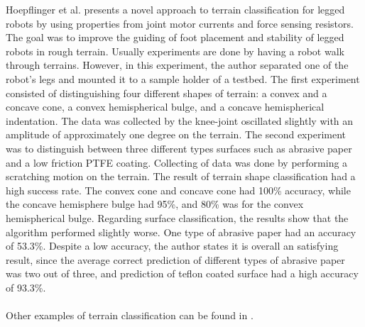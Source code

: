 \documentclass[USenglish]{ifimaster}  %
\begin{document}
Hoepflinger et al. \cite{5509309} presents a novel approach to terrain classification for legged robots by using properties from joint motor currents and force sensing resistors. The goal was to improve the guiding of foot placement and stability of legged robots in rough terrain. Usually experiments are done by having a robot walk through terrains. However, in this experiment, the author separated one of the robot’s legs and mounted it to a sample holder of a testbed. The first experiment consisted of distinguishing four different shapes of terrain: a convex and a concave cone, a convex hemispherical bulge, and a concave hemispherical indentation. The data was collected by the knee-joint oscillated slightly with an amplitude of approximately one degree on the terrain. The second experiment was to distinguish between three different types surfaces such as abrasive paper and a low friction PTFE coating. Collecting of data was done by performing a scratching motion on the terrain. The result of terrain shape classification had a high success rate. The convex cone and concave cone had 100\% accuracy, while the concave hemisphere bulge had 95\%, and 80\% was for the convex hemispherical bulge. Regarding surface classification, the results show that the algorithm performed slightly worse. One type of abrasive paper had an accuracy of 53.3\%. Despite a low accuracy, the author states it is overall an satisfying result, since the average correct prediction of different types of abrasive paper was two out of three, and prediction of teflon coated surface had a high accuracy of 93.3\%.
\\
\\
Other examples of terrain classification can be found in \cite{Giguere2009,6386243,6569179,4399500}.
	
\end{document}
